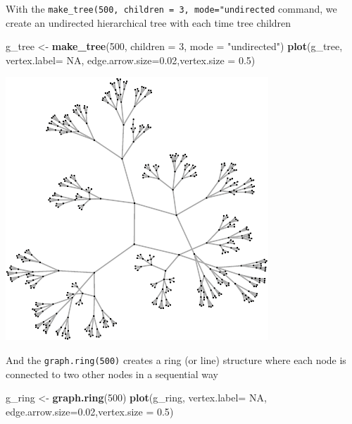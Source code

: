 \documentclass[]{article}
\newenvironment{Shaded}{\begin{snugshade}}{\end{snugshade}}
\newcommand{\KeywordTok}[1]{\textcolor[rgb]{0.13,0.29,0.53}{\textbf{#1}}}
\newcommand{\DataTypeTok}[1]{\textcolor[rgb]{0.13,0.29,0.53}{#1}}
\newcommand{\DecValTok}[1]{\textcolor[rgb]{0.00,0.00,0.81}{#1}}
\newcommand{\FloatTok}[1]{\textcolor[rgb]{0.00,0.00,0.81}{#1}}
\newcommand{\StringTok}[1]{\textcolor[rgb]{0.31,0.60,0.02}{#1}}
\newcommand{\OtherTok}[1]{\textcolor[rgb]{0.56,0.35,0.01}{#1}}
\newcommand{\NormalTok}[1]{#1}
\theoremstyle{definition}
\theoremstyle{definition}
\theoremstyle{definition}
\theoremstyle{remark}
\begin{document}
With the \texttt{make\_tree(500,\ children\ =\ 3,\ mode="undirected}
command, we create an undirected hierarchical tree with each time tree
children

\begin{Shaded}
\begin{Highlighting}[]
\NormalTok{g_tree <-}\StringTok{ }\KeywordTok{make_tree}\NormalTok{(}\DecValTok{500}\NormalTok{, }\DataTypeTok{children =} \DecValTok{3}\NormalTok{, }\DataTypeTok{mode =} \StringTok{"undirected"}\NormalTok{)}
\KeywordTok{plot}\NormalTok{(g_tree, }\DataTypeTok{vertex.label=} \OtherTok{NA}\NormalTok{, }\DataTypeTok{edge.arrow.size=}\FloatTok{0.02}\NormalTok{,}\DataTypeTok{vertex.size =} \FloatTok{0.5}\NormalTok{)}
\end{Highlighting}
\end{Shaded}

\includegraphics{ResearchTools_files/figure-latex/unnamed-chunk-52-1.pdf}

And the \texttt{graph.ring(500)} creates a ring (or line) structure
where each node is connected to two other nodes in a sequential way

\begin{Shaded}
\begin{Highlighting}[]
\NormalTok{g_ring <-}\StringTok{ }\KeywordTok{graph.ring}\NormalTok{(}\DecValTok{500}\NormalTok{)}
\KeywordTok{plot}\NormalTok{(g_ring, }\DataTypeTok{vertex.label=} \OtherTok{NA}\NormalTok{, }\DataTypeTok{edge.arrow.size=}\FloatTok{0.02}\NormalTok{,}\DataTypeTok{vertex.size =} \FloatTok{0.5}\NormalTok{)}
\end{Highlighting}
\end{Shaded}
\end{document}
